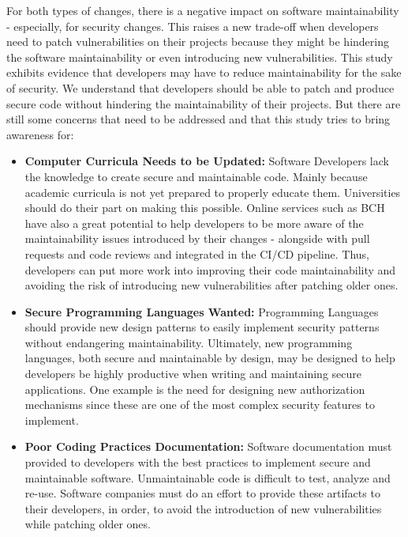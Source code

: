 \documentclass[10pt,conference]{IEEEtran}
\begin{document}
For both types of changes, there is a negative impact
on software maintainability - especially, for security changes. This raises 
a new trade-off when developers need to patch vulnerabilities on their projects
because they might be hindering the software maintainability or even introducing
new vulnerabilities. This study exhibits evidence that developers may have to
reduce maintainability for the sake of security. We understand that developers
should be able to patch and produce secure code without hindering the maintainability of
their projects. But there are still some concerns that need to be addressed
and that this study tries to bring awareness for:

\begin{itemize}

	\item\textbf{Computer Curricula Needs to be Updated:}
	Software Developers lack the knowledge to create secure and
	maintainable code. Mainly because academic curricula is not yet prepared
	to properly educate them. Universities should do their part on making
	this possible. Online services such as BCH have also a great potential to help
	developers to be more aware of the maintainability issues introduced by their
	changes - alongside with pull requests and code reviews and integrated in 
	the CI/CD pipeline. Thus, developers can 
	put more work into improving their code maintainability and avoiding the risk
	of introducing new vulnerabilities after patching older ones.
	
	\item\textbf{Secure Programming Languages Wanted:} Programming Languages 
	should provide new design patterns to easily implement security patterns 
	without endangering maintainability.
	Ultimately, new programming languages, both secure and maintainable by design,
	may be designed to help developers be highly productive when writing and
	maintaining secure applications. One example is the need for designing new
	authorization mechanisms since these are one of the most complex security
	features to implement.
	
	\item\textbf{Poor Coding Practices Documentation:} 
	Software documentation must provided to developers with the
	best practices to implement secure and maintainable software. Unmaintainable
	code is difficult to test, analyze and re-use. Software companies must
	do an effort to provide these artifacts to their developers, in order,
	to avoid the introduction of new vulnerabilities while patching older ones.
	
\end{itemize}
\end{document}
